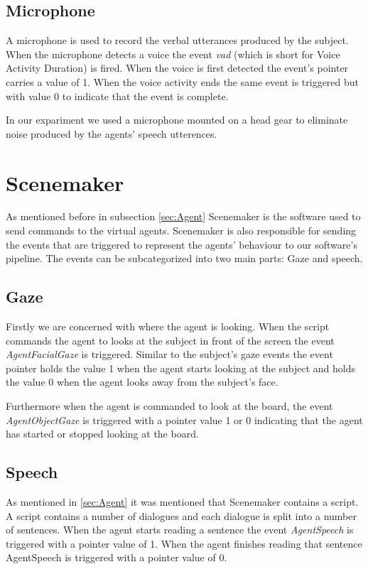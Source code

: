 \documentclass[12pt, a4paper, fleqn]{memoir}%
\begin{document}
\subsection{Microphone}
A microphone is used to record the verbal utterances produced by the subject. When the microphone detects a voice the event \textit{vad} (which is short for Voice Activity Duration) is fired. When the voice is first detected the event's pointer carries a value of 1. When the voice activity ends the same event is triggered but with value 0 to indicate that the event is complete.

In our expariment we used a microphone mounted on a head gear to eliminate noise produced by the agents' speech utterences.

\section{Scenemaker}
\label{sec:Scenemaker}
As mentioned before in subsection \ref{sec:Agent} Scenemaker is the software used to send commands to the virtual agents. Scenemaker is also responsible for sending the events that are triggered to represent the agents' behaviour to our software's pipeline. The events can be subcategorized into two main parts: Gaze and speech.

\subsection{Gaze}
Firstly we are concerned with where the agent is looking. When the script commands the agent to looks at the subject in front of the screen the event \textit{AgentFacialGaze} is triggered. Similar to the subject's gaze events the event pointer holds the value 1 when the agent starts looking at the subject and holds the value 0 when the agent looks away from the subject's face.

Furthermore when the agent is commanded to look at the board, the event \textit{AgentObjectGaze} is triggered with a pointer value 1 or 0 indicating that the agent has started or stopped looking at the board.

\subsection{Speech}
As mentioned in \ref{sec:Agent} it was mentioned that Scenemaker contains a script. A script contains a number of dialogues and each dialogue is split into a number of sentences. When the agent starts reading a sentence the event \textit{AgentSpeech} is triggered with a pointer value of 1. When the agent finishes reading that sentence AgentSpeech is triggered with a pointer value of 0.
\end{document}
